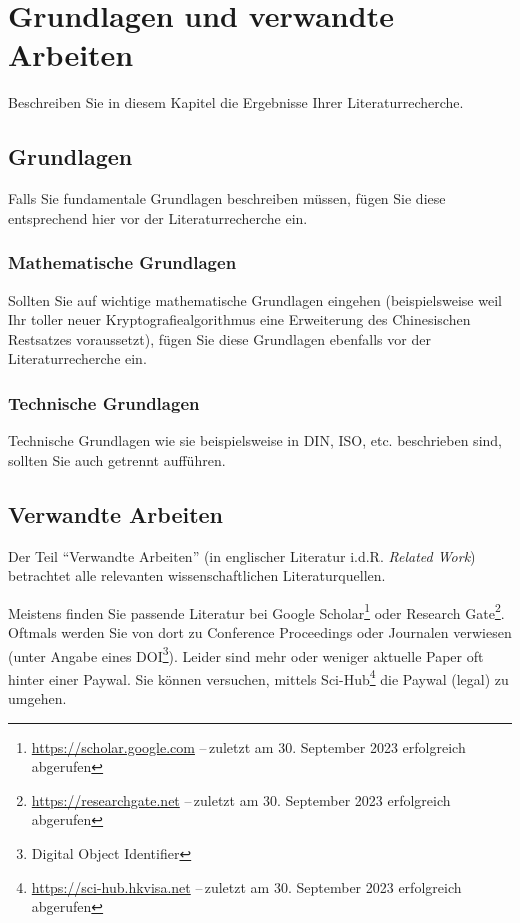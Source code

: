\chapter{Grundlagen und verwandte Arbeiten}\label{chap:RelatedWork}
Beschreiben Sie in diesem Kapitel die Ergebnisse Ihrer Literaturrecherche.

\section{Grundlagen}\label{sec:RelatedWork:Foundations}
Falls Sie fundamentale Grundlagen beschreiben müssen, fügen Sie diese entsprechend hier vor der Literaturrecherche ein.

\subsection{Mathematische Grundlagen}\label{subsec:RelatedWork:Foundations:Maths}
Sollten Sie auf wichtige mathematische Grundlagen eingehen (beispielsweise weil Ihr toller neuer Kryptografiealgorithmus eine Erweiterung des Chinesischen Restsatzes voraussetzt), fügen Sie diese Grundlagen ebenfalls vor der Literaturrecherche ein.

\subsection{Technische Grundlagen}\label{subsec:RelatedWork:Foundations:Techs}
Technische Grundlagen wie sie beispielsweise in DIN, ISO, etc. beschrieben sind, sollten Sie auch getrennt aufführen.

\section{Verwandte Arbeiten}\label{sec:RelatedWork:Publications}
Der Teil \enquote{Verwandte Arbeiten} (in englischer Literatur i.d.R. \emph{Related Work}) betrachtet alle relevanten wissenschaftlichen Literaturquellen.

Meistens finden Sie passende Literatur bei Google Scholar\footnote{\url{https://scholar.google.com} --\,zuletzt am 30. September 2023 erfolgreich abgerufen} oder Research Gate\footnote{\url{https://researchgate.net} --\,zuletzt am 30. September 2023 erfolgreich abgerufen}. Oftmals werden Sie von dort zu Conference Proceedings oder Journalen verwiesen (unter Angabe eines DOI\footnote{Digital Object Identifier}). Leider sind mehr oder weniger aktuelle Paper oft hinter einer Paywal. Sie können versuchen, mittels Sci-Hub\footnote{\url{https://sci-hub.hkvisa.net} --\,zuletzt am 30. September 2023 erfolgreich abgerufen} die Paywal (legal) zu umgehen.


